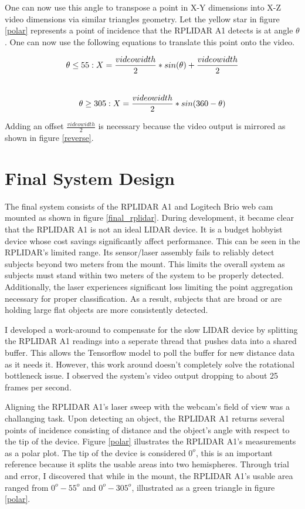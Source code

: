 \documentclass{article}
\begin{document}
  One can now use this angle to transpose a point in X-Y dimensions into X-Z video dimensions via similar triangles geometry.
  Let the yellow star in figure \ref{polar} represents a point of incidence that the RPLIDAR A1 detects is at angle \( \theta\).
  One can now use the following equations to translate this point onto the video.

\begin{equation} \label{eq1}
  \theta \leq  55:
  X = \frac{video width}{2} * sin(\theta) + \frac{video width}{2}\\
\end{equation}
\\
\begin{equation} \label{eq2}
  \theta \geq 305:
  X = \frac{video width}{2} * sin(360 - \theta)\\
\end{equation}

Adding an offset \(\frac{video width}{2}\) is necessary because the video output is mirrored as shown in figure \ref{reverse}.


\section{Final System Design}
  The final system consists of the RPLIDAR A1 and Logitech Brio web cam mounted as shown in figure \ref{final_rplidar}.
  During development, it became clear that the RPLIDAR A1 is not an ideal LIDAR device.
  It is a budget hobbyist device whose cost savings significantly affect performance.
  This can be seen in the RPLIDAR's limited range.
  Its sensor/laser assembly fails to reliably detect subjects beyond two meters from the mount. 
  This limits the overall system as subjects must stand within two meters of the system to be properly detected.
  Additionally, the laser experiences significant loss limiting the point aggregation necessary for proper classification.
  As a result, subjects that are broad or are holding large flat objects are more consistently detected.


  I developed a work-around to compensate for the slow LIDAR device by splitting the RPLIDAR A1 readings into a seperate thread that pushes data into a shared buffer.
  This allows the Tensorflow model to poll the buffer for new distance data as it needs it.
  However, this work around doesn't completely solve the rotational bottleneck issue. 
  I observed the system's video output dropping to about 25 frames per second.


  Aligning the RPLIDAR A1's laser sweep with the webcam's field of view was a challanging task.
  Upon detecting an object, the RPLIDAR A1 returns several points of incidence consisting of distance and the object's angle with respect to the tip of the device.
  Figure \ref{polar} illustrates the RPLIDAR A1's measurements as a polar plot.
  The tip of the device is considered \( 0^o \), this is an important reference because it splits the usable areas into two hemispheres.
  Through trial and error, I discovered that while in the mount, the RPLIDAR A1's usable area ranged from \( 0^o - 55^o\) and \( 0^o - 305^o\), illustrated as a green triangle in figure \ref{polar}.
\end{document}
